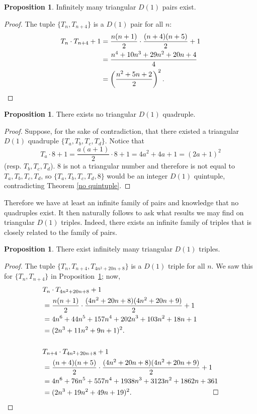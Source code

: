 \documentclass[12pt]{amsart}
\renewcommand{\qedsymbol}{$\blacksquare$}
\theoremstyle{theorem}
\theoremstyle{definition}
\newtheorem{proposition}[theorem]{Proposition}
\theoremstyle{plain}
\begin{document}
\begin{proposition}\label{prop:infpair}
    Infinitely many triangular $D(1)$ pairs exist. 
\end{proposition}
\begin{proof}
    The tuple $\{T_n,T_{n+4}\}$ is a $D(1)$ pair for all $n$: \begin{align*}
        T_n\cdot T_{n+4}+1&=\frac{n(n+1)}{2}\cdot\frac{(n+4)(n+5)}{2}+1\\&=\frac{n^4+10n^3+29n^2+20n+4}{4}\\&=\left(\frac{n^2+5n+2}{2}\right)^2.\qedhere
    \end{align*}
\end{proof}

\begin{proposition}
    There exists no triangular $D(1)$ quadruple.
\end{proposition}
\begin{proof}
    Suppose, for the sake of contradiction, that there existed a triangular $D(1)$ quadruple $\{T_a,T_b,T_c,T_d\}$. Notice that \[T_a\cdot 8+1=\frac{a(a+1)}{2}\cdot 8+1=4a^2+4a+1=(2a+1)^2\] (resp. $T_b,T_c,T_d$). 8 is not a triangular number and therefore is not equal to $T_a, T_b, T_c, T_d$, so $\{T_a,T_b,T_c,T_d,8\}$ would be an integer $D(1)$ quintuple, contradicting Theorem \ref{no quintuple}.
\end{proof}

Therefore we have at least an infinite family of pairs and knowledge that no quadruples exist. It then naturally follows to ask what results we may find on triangular $D(1)$ triples. Indeed, there exists an infinite family of triples that is closely related to the family of pairs.

\begin{proposition}\label{prop:inftrip}
    There exist infinitely many triangular $D(1)$ triples.
\end{proposition}
\begin{proof}
    The tuple $\{T_n,T_{n+4},T_{4n^2+20n+8}\}$ is a $D(1)$ triple for all $n$. We saw this for $\{T_{n}, T_{n+4} \}$ in Proposition~\ref{prop:infpair}; now, \begin{align*}
        &T_n\cdot T_{4n^2+20n+8}+1\\&=\frac{n(n+1)}{2}\cdot\frac{(4n^2+20n+8)(4n^2+20n+9)}{2}+1\\&=4n^6+44n^5+157n^4+202n^3+103n^2+18n+1\\&=(2n^3+11n^2+9n+1)^2.\\\\&T_{n+4}\cdot T_{4n^2+20n+8}+1\\&=\frac{(n+4)(n+5)}{2}\cdot\frac{(4n^2+20n+8)(4n^2+20n+9)}{2}+1\\&=4n^6+76n^5+557n^4+1938n^3+3123n^2+1862n+361\\&=(2n^3+19n^2+49n+19)^2.\hspace{11.6em}\square
    \end{align*}
    \renewcommand{\qedsymbol}{}
\end{proof}
\end{document}

